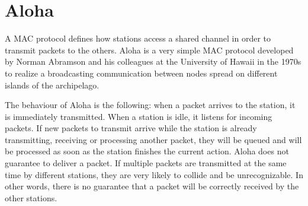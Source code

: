 \section{Aloha}
\label{sec:aloha}

A \ac{MAC} protocol defines how stations access a shared channel in order to transmit packets to the others.
Aloha is a very simple \ac{MAC} protocol developed by Norman Abramson and his colleagues at the University of Hawaii in the 1970s to realize a broadcasting communication between nodes spread on different islands of the archipelago.

The behaviour of Aloha is the following: when a packet arrives to the station, it is immediately transmitted.
When a station is idle, it listens for incoming packets.
If new packets to transmit arrive while the station is already transmitting, receiving or processing another packet, they will be queued and will be processed as soon as the station finishes the current action.
Aloha does not guarantee to deliver a packet.
If multiple packets are transmitted at the same time by different stations, they are very likely to collide and be unrecognizable.
In other words, there is no guarantee that a packet will be correctly received by the other stations.
